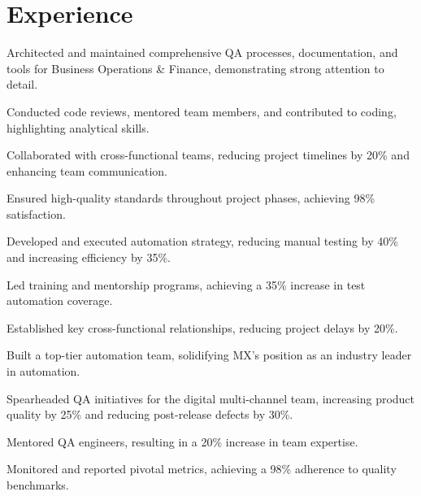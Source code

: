\documentclass[hmargin=1.25cm, vmargin=0.75cm, scale=0.92]{deedy-resume-openfont}
\begin{document}
\begin{minipage}[t]{0.66\textwidth}

\section{Experience}

\begin{tightemize}
\item Architected and maintained comprehensive QA processes, documentation, and tools for Business Operations \& Finance, demonstrating strong attention to detail.
\item Conducted code reviews, mentored team members, and contributed to coding, highlighting analytical skills.
\item Collaborated with cross-functional teams, reducing project timelines by 20\% and enhancing team communication.
\item Ensured high-quality standards throughout project phases, achieving 98\% satisfaction.
\end{tightemize}

\begin{tightemize}
\item Developed and executed automation strategy, reducing manual testing by 40\% and increasing efficiency by 35\%.
\item Led training and mentorship programs, achieving a 35\% increase in test automation coverage.
\item Established key cross-functional relationships, reducing project delays by 20\%.
\item Built a top-tier automation team, solidifying MX's position as an industry leader in automation.
\end{tightemize}

\begin{tightemize}
\item Spearheaded QA initiatives for the digital multi-channel team, increasing product quality by 25\% and reducing post-release defects by 30\%.
\item Mentored QA engineers, resulting in a 20\% increase in team expertise.
\item Monitored and reported pivotal metrics, achieving a 98\% adherence to quality benchmarks.
\end{tightemize}


\end{minipage}
\end{document}
